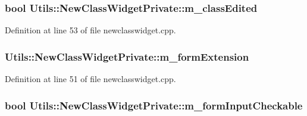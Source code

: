 \hypertarget{struct_utils_1_1_new_class_widget_private_ae5a992cfba229575b4392b57c4f07530}{
\subsubsection[{m\-\_\-class\-Edited}]{\setlength{\rightskip}{0pt plus 5cm}bool {\bf \-Utils\-::\-New\-Class\-Widget\-Private\-::m\-\_\-class\-Edited}}}\label{struct_utils_1_1_new_class_widget_private_ae5a992cfba229575b4392b57c4f07530}


\-Definition at line 53 of file newclasswidget.\-cpp.

\hypertarget{struct_utils_1_1_new_class_widget_private_af5f72a25e0ff2277f00f79418b100604}{
\subsubsection[{m\-\_\-form\-Extension}]{ {\bf \-Utils\-::\-New\-Class\-Widget\-Private\-::m\-\_\-form\-Extension}}}\label{struct_utils_1_1_new_class_widget_private_af5f72a25e0ff2277f00f79418b100604}


\-Definition at line 51 of file newclasswidget.\-cpp.

\hypertarget{struct_utils_1_1_new_class_widget_private_ab96a1a9b91703038e3475355d3cb42cf}{
\subsubsection[{m\-\_\-form\-Input\-Checkable}]{\setlength{\rightskip}{0pt plus 5cm}bool {\bf \-Utils\-::\-New\-Class\-Widget\-Private\-::m\-\_\-form\-Input\-Checkable}}}\label{struct_utils_1_1_new_class_widget_private_ab96a1a9b91703038e3475355d3cb42cf}


